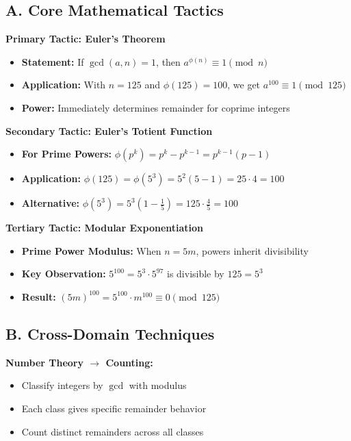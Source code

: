 \documentclass[12pt]{article}
\begin{document}
\vspace{1em}

\begin{tacticalbox}
\subsection*{A. Core Mathematical Tactics}

\textbf{Primary Tactic: Euler's Theorem}
\begin{itemize}
    \item \textbf{Statement:} If $\gcd(a, n) = 1$, then $a^{\phi(n)} \equiv 1 \pmod{n}$
    \item \textbf{Application:} With $n = 125$ and $\phi(125) = 100$, we get $a^{100} \equiv 1 \pmod{125}$
    \item \textbf{Power:} Immediately determines remainder for coprime integers
\end{itemize}

\textbf{Secondary Tactic: Euler's Totient Function}
\begin{itemize}
    \item \textbf{For Prime Powers:} $\phi(p^k) = p^k - p^{k-1} = p^{k-1}(p - 1)$
    \item \textbf{Application:} $\phi(125) = \phi(5^3) = 5^2(5 - 1) = 25 \cdot 4 = 100$
    \item \textbf{Alternative:} $\phi(5^3) = 5^3(1 - \frac{1}{5}) = 125 \cdot \frac{4}{5} = 100$
\end{itemize}

\textbf{Tertiary Tactic: Modular Exponentiation}
\begin{itemize}
    \item \textbf{Prime Power Modulus:} When $n = 5m$, powers inherit divisibility
    \item \textbf{Key Observation:} $5^{100} = 5^3 \cdot 5^{97}$ is divisible by $125 = 5^3$
    \item \textbf{Result:} $(5m)^{100} = 5^{100} \cdot m^{100} \equiv 0 \pmod{125}$
\end{itemize}

\subsection*{B. Cross-Domain Techniques}

\textbf{Number Theory $\rightarrow$ Counting:}
\begin{itemize}
    \item Classify integers by $\gcd$ with modulus
    \item Each class gives specific remainder behavior
    \item Count distinct remainders across all classes
\end{itemize}


\end{tacticalbox}
\end{document}

